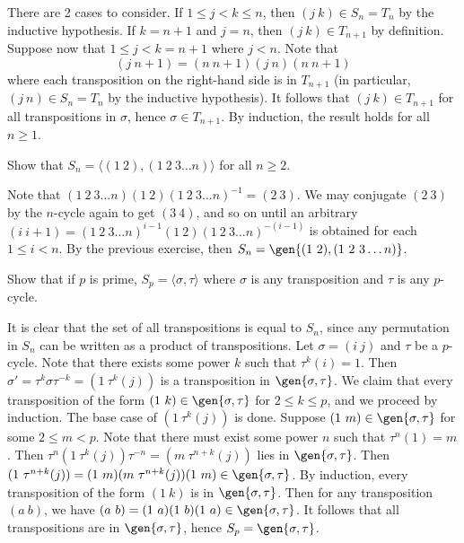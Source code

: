 \begin{problems}
\begin{sol}
        There are 2 cases to consider. If $1 \leq j < k \leq n$, then $(j\ k) \in S_n = T_n$ by the inductive hypothesis. If $k = n + 1$ and $j = n$, then $(j\ k) \in T_{n + 1}$ by definition. Suppose now that $1 \leq j < k = n + 1$ where $j < n$. Note that
        \[(j\ n + 1) = (n\ n + 1)(j\ n)(n\ n + 1)\]
        where each transposition on the right-hand side is in $T_{n + 1}$ (in particular, $(j\ n) \in S_n = T_n$ by the inductive hypothesis). It follows that $(j\ k) \in T_{n + 1}$ for all transpositions in $\sigma$, hence $\sigma \in T_{n + 1}$. By induction, the result holds for all $n \geq 1$.
    \end{sol}
    \item Show that $S_n=\langle (1\ 2),(1\ 2\ 3 \ldots n)\rangle$ for all $n\ge2$.
    \begin{sol}
        Note that $(1\ 2\ 3 \ldots n)(1\ 2)(1\ 2\ 3 \ldots n)^{-1} = (2\ 3)$. We may conjugate $(2\ 3)$ by the $n$-cycle again to get $(3\ 4)$, and so on until an arbitrary $(i\ i + 1) = (1\ 2\ 3 \ldots n)^{i - 1}(1\ 2)(1\ 2\ 3 \ldots n)^{-(i - 1)}$ is obtained for each $1 \leq i < n$. By the previous exercise, then $S_n = \gen{(1\ 2), (1\ 2\ 3 \ldots n)}$.
    \end{sol}
    \item Show that if $p$ is prime, $S_p=\langle \sigma,\tau\rangle$ where $\sigma$ is any transposition and $\tau$ is any $p$-cycle.
    \begin{sol}
        It is clear that the set of all transpositions is equal to $S_n$, since any permutation in $S_n$ can be written as a product of transpositions. Let $\sigma = (i\ j)$ and $\tau$ be a $p$-cycle. Note that there exists some power $k$ such that $\tau^k(i) = 1$. Then $\sigma' = \tau^k\sigma\tau^{-k} = (1\ \tau^k(j))$ is a transposition in $\gen{\sigma, \tau}$. We claim that every transposition of the form $(1\ k) \in \gen{\sigma, \tau}$ for $2 \leq k \leq p$, and we proceed by induction. The base case of $(1\ \tau^k(j))$ is done. Suppose $(1\ m) \in \gen{\sigma, \tau}$ for some $2 \leq m < p$. Note that there must exist some power $n$ such that $\tau^n(1) = m$. Then $\tau^n(1\ \tau^k(j))\tau^{-n} = (m\ \tau^{n + k}(j))$ lies in $\gen{\sigma, \tau}$. Then $(1\ \tau^{n + k}(j)) = (1\ m)(m\ \tau^{n + k}(j))(1\ m) \in \gen{\sigma, \tau}$. By induction, every transposition of the form $(1\ k)$ is in $\gen{\sigma, \tau}$. Then for any transposition $(a\ b)$, we have $(a\ b) = (1\ a)(1\ b)(1\ a) \in \gen{\sigma, \tau}$. It follows that all transpositions are in $\gen{\sigma, \tau}$, hence $S_p = \gen{\sigma, \tau}$.

\end{sol}
\end{problems}
